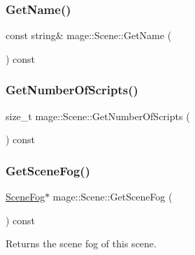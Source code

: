 \hypertarget{classmage_1_1_scene_a6afd25c30d08eb579eb430af49cf8fc0}{}\label{classmage_1_1_scene_a6afd25c30d08eb579eb430af49cf8fc0} 
\subsubsection{\texorpdfstring{Get\+Name()}{GetName()}}
{\footnotesize\ttfamily const string\& mage\+::\+Scene\+::\+Get\+Name (\begin{DoxyParamCaption}{ }\end{DoxyParamCaption}) const\hspace{0.3cm}{\ttfamily [noexcept]}}

\hypertarget{classmage_1_1_scene_a33cecd2fd2b393ccac84b94ec8cc53c0}{}\label{classmage_1_1_scene_a33cecd2fd2b393ccac84b94ec8cc53c0} 
\subsubsection{\texorpdfstring{Get\+Number\+Of\+Scripts()}{GetNumberOfScripts()}}
{\footnotesize\ttfamily size\+\_\+t mage\+::\+Scene\+::\+Get\+Number\+Of\+Scripts (\begin{DoxyParamCaption}{ }\end{DoxyParamCaption}) const\hspace{0.3cm}{\ttfamily [noexcept]}}

\hypertarget{classmage_1_1_scene_a1f21d92feb659477ceb4642322fa2f0c}{}\label{classmage_1_1_scene_a1f21d92feb659477ceb4642322fa2f0c} 
\subsubsection{\texorpdfstring{Get\+Scene\+Fog()}{GetSceneFog()}}
{\footnotesize\ttfamily \hyperlink{structmage_1_1_scene_fog}{Scene\+Fog}$\ast$ mage\+::\+Scene\+::\+Get\+Scene\+Fog (\begin{DoxyParamCaption}{ }\end{DoxyParamCaption}) const\hspace{0.3cm}{\ttfamily [noexcept]}}

Returns the scene fog of this scene.

